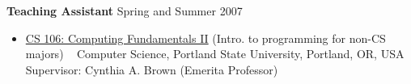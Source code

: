 \documentclass[11pt,letterpaper]{article}
\renewcommand{\section}[1]{\pagebreak[3]%
    \hyphenpenalty=10000%
    \vspace{1.3\baselineskip}%
    \phantomsection\addcontentsline{toc}{section}{#1}%
    \noindent\llap{\scshape\smash{\parbox[t]{\marginparwidth}{\raggedright #1}}}%
    \vspace{-\baselineskip}\par}
\newenvironment{innerlist}[1][\enskip\textbullet]%
        {\begin{itemize}[#1,leftmargin=*,parsep=0pt,itemsep=0pt,topsep=0pt,partopsep=0pt]}
        {\end{itemize}}
\providecommand*\url[1]{\href{#1}{#1}}
\renewcommand*\url[1]{\href{#1}{\texttt{#1}}}
\begin{document}
\textbf{Teaching Assistant} \hfill {Spring and Summer 2007}
\begin{innerlist}
\item[] \href{http://www.pdx.edu/computer-science/cs-106-computing-fundamentals-ii}
             {CS 106: Computing Fundamentals II}
             {\small(Intro. to programming for non-CS majors)} ~\newline
        Computer Science, Portland State University, Portland, OR, USA ~\newline
        Supervisor: Cynthia A. Brown (Emerita Professor)
\end{innerlist}

\end{document}
